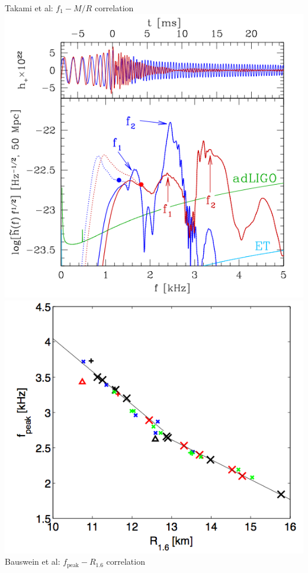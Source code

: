 \documentclass{beamer}
\begin{document}
\begin{frame}
\begin{small}
\begin{columns}[]
        \centering
        \tiny{Takami et al: $f_1-M/R$ correlation}
        \vspace{-0.35cm}
        \includegraphics[width=\textwidth]{takami_spectrum.png} \\
        \centering
        \includegraphics[width=\textwidth]{bauswein_fpeak.png} \\
        \tiny{Bauswein et al: $f_{\text{peak}}-R_{1.6}$ correlation}
    \end{columns}
\end{small}
\end{frame}
\end{document}
